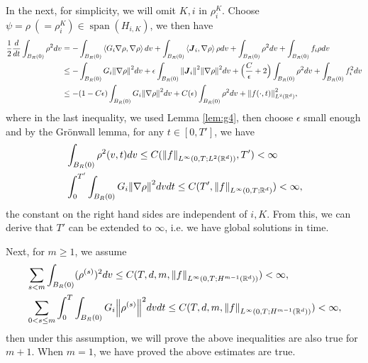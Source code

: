 \documentclass[a4paper, 11pt]{article}
\newcommand{\inner}[2]{\left< #1 , #2 \right>}
\theoremstyle{plain}
\theoremstyle{remark}
\theoremstyle{definition}
\newcommand{\intt}{\int_0^T}
\newcommand{\intr}{\int_{B_R(0)}}
\newcommand{\J}{\boldsymbol{J}}
\begin{document}
		In the next, for simplicity, we will omit $K,i$ in $\rho_i^K$. Choose $\psi=\rho~(=\rho_i^K)\in \operatorname{span}(H_{i,K})$, we then have
		\begin{equation}\label{eq:95}
			\begin{aligned}
				\frac{1}{2}\frac{d}{dt}\intr\rho^2dv&=-\intr\inner{G_i\nabla\rho}{\nabla\rho} dv+\intr\inner{\J_i}{\nabla\rho}\rho dv+\intr \rho^2 dv+\intr f_i\rho dv\\
				&\leq -\intr G_i\norm{\nabla\rho}^2 dv+\epsilon\intr \norm{\J_i}^2\norm{\nabla\rho}^2dv+\Big(\frac{C}{\epsilon}+2\Big)\intr\rho^2dv+\intr f_i^2dv\\
				&\leq -(1-C\epsilon)\intr{G_i}\norm{\nabla\rho}^2dv+C(\epsilon)\intr\rho^2dv+\norm{f(\cdot,t)}^2_{L^2(\mathbb{R}^d)},
			\end{aligned}
		\end{equation}
		where in the last inequality, we used Lemma \ref{lem:g4}, then choose $\epsilon$ small enough and by the Gr\"onwall lemma, for any $t\in [0,T']$, we have
		\begin{align}
			&\intr\rho^2(v,t)dv\leq C(\norm{f}_{L^\infty(0,T;L^2(\mathbb{R}^d))},T')<\infty\\
			&\int_0^{T'}\intr G_i\norm{\nabla\rho}^2dvdt\leq C(T',\norm{f}_{L^\infty(0,T;\mathbb{R}^d)})<\infty,
		\end{align}
		the constant on the right hand sides are independent of $i,K$. From this, we can derive that $T'$ can be extended to $\infty$, i.e. we have global solutions in time.
		
		Next, for $m\geq 1$, we assume
		\begin{equation}\label{eqs:g66}
			\begin{aligned}
					&\sum_{s<m}\intr(\rho^{(s)})^2dv\leq C(T,d,m,\norm{f}_{L^{\infty}(0,T;H^{m-1}(\mathbb{R}^d))})<\infty,\\
					&\sum_{0<s\leq m}\intt\intr G_i\norm{\rho^{(s)}}^2dvdt\leq C(T,d,m,\norm{f}_{L^{\infty}(0,T;H^{m-1}(\mathbb{R}^d))})<\infty,
			\end{aligned}
		\end{equation}
        then under this assumption, we will prove the above inequalities are also true for $m+1$. When $m=1$, we have proved the above estimates are true.
		
\end{document}
